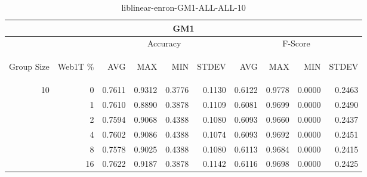 \begin{center}
\begin{table}[htbp]
\begin{tabular}{ | r | r | r | r | r | r | r | r | r | r |}
\hline
\multicolumn{10}{|c|}{GM1}\\
\hline
 & & \multicolumn{4}{|c|}{Accuracy} & \multicolumn{4}{|c|}{F-Score}\\ \cline{3-10}
\begin{sideways}Group Size\end{sideways} & \begin{sideways}Web1T \%\end{sideways} & \begin{sideways}AVG\end{sideways} & \begin{sideways}MAX\end{sideways} & \begin{sideways}MIN\end{sideways} & \begin{sideways}STDEV\end{sideways} & \begin{sideways}AVG\end{sideways} & \begin{sideways}MAX\end{sideways} & \begin{sideways}MIN\end{sideways} & \begin{sideways}STDEV\end{sideways}\\
\hline
\multirow{5}{*}{10}
 & 0 & 0.7611 & 0.9312 & 0.3776 & 0.1130 & 0.6122 & 0.9778 & 0.0000 & 0.2463\\ \cline{2-10}
 & 1 & 0.7610 & 0.8890 & 0.3878 & 0.1109 & 0.6081 & 0.9699 & 0.0000 & 0.2490\\ \cline{2-10}
 & 2 & 0.7594 & 0.9068 & 0.4388 & 0.1080 & 0.6093 & 0.9660 & 0.0000 & 0.2437\\ \cline{2-10}
 & 4 & 0.7602 & 0.9086 & 0.4388 & 0.1074 & 0.6093 & 0.9692 & 0.0000 & 0.2451\\ \cline{2-10}
 & 8 & 0.7578 & 0.9025 & 0.4388 & 0.1080 & 0.6113 & 0.9684 & 0.0000 & 0.2415\\ \cline{2-10}
 & 16 & 0.7622 & 0.9187 & 0.3878 & 0.1142 & 0.6116 & 0.9698 & 0.0000 & 0.2425\\ \cline{2-10}
\hline
\end{tabular}
\caption{liblinear-enron-GM1-ALL-ALL-10}
\label{table:liblinear-enron-GM1-ALL-ALL-10}
\end{table}
\end{center}

